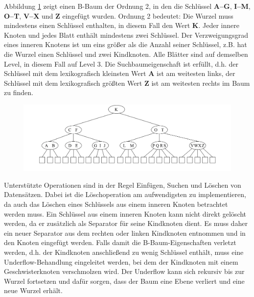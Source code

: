 Abbildung \ref{fig:pic3} zeigt einen B-Baum der Ordnung 2, in den die Schlüssel \textbf{A--G}, \textbf{I--M}, \textbf{O--T}, \textbf{V--X} und \textbf{Z} eingefügt wurden. Ordnung 2 bedeutet: Die Wurzel muss mindestens einen Schlüssel enthalten, in diesem Fall den Wert \textbf{K}. Jeder innere Knoten und jedes Blatt enthält mindestens zwei Schlüssel. Der Verzweigungsgrad eines inneren Knotens ist um eins größer als die Anzahl seiner Schlüssel, z.B. hat die Wurzel einen Schlüssel und zwei Kindknoten. Alle Blätter sind auf demselben Level, in diesem Fall auf Level 3. Die Suchbaumeigenschaft ist erfüllt, d.h. der Schlüssel mit dem lexikografisch kleinsten Wert \textbf{A} ist am weitesten links, der Schlüssel mit dem lexikografisch größten Wert \textbf{Z} ist am weitesten rechts im Baum zu finden. 
\begin{figure}[hpbt]
  \centering
  \label{fig:pic3}
  \includegraphics[width=1.0\textwidth]{pictures/b-baum.png}
\end{figure}

\noindent
Unterstützte Operationen sind in der Regel Einfügen, Suchen und Löschen von Datensätzen. Dabei ist die Löschoperation am aufwendigsten zu implementieren, da auch das Löschen eines Schlüssels aus einem inneren Knoten betrachtet werden muss. Ein Schlüssel aus einem inneren Knoten kann nicht direkt gelöscht werden, da er zusätzlich als Separator für seine Kindknoten dient. Es muss daher ein neuer Separator aus dem rechten oder linken Kindknoten entnommen und in den Knoten eingefügt werden. Falls damit die B-Baum-Eigenschaften verletzt werden, d.h. der Kindknoten anschließend zu wenig Schlüssel enthält, muss eine Underflow-Behandlung eingeleitet werden, bei dem der Kindknoten mit einem Geschwisterknoten verschmolzen wird. Der Underflow kann sich rekursiv bis zur Wurzel fortsetzen und dafür sorgen, dass der Baum eine Ebene verliert und eine neue Wurzel erhält. 
